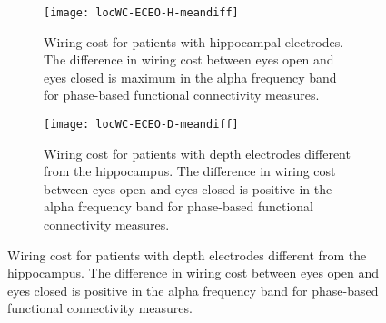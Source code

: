 \documentclass[11pt, onecolumn]{article}
\begin{document}
\begin{figure}[h] 
  \begin{subfigure}[t]{0.5\linewidth}
    \centering
    \texttt{[image: locWC-ECEO-H-meandiff]} 
    \caption{Wiring cost for patients with hippocampal electrodes. The difference in wiring cost between eyes open and eyes closed is maximum in the alpha frequency band for phase-based functional connectivity measures.} 
    \label{figi-2:a} 
  \end{subfigure}%
  \hspace{1ex}
  \begin{subfigure}[t]{0.5\linewidth}
    \centering
    \texttt{[image: locWC-ECEO-D-meandiff]} 
    \caption{Wiring cost for patients with depth electrodes different from the hippocampus. The difference in wiring cost between eyes open and eyes closed is positive in the alpha frequency band for phase-based functional connectivity measures.} 
    \label{figi-2:b} 
  \end{subfigure} 
  

\end{figure}
\end{document}
